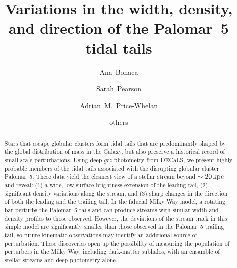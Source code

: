 \documentclass[twocolumn]{aastex62}
\begin{document}
\sloppy\sloppypar\raggedbottom\frenchspacing %

\title{Variations in the width, density, and direction of the Palomar~5 tidal tails}

\author[0000-0002-7846-9787]{Ana~Bonaca}

\author[0000-0003-0256-5446]{Sarah~Pearson}

\author[0000-0003-0872-7098]{Adrian~M.~Price-Whelan}

\author{others}

\begin{abstract}\noindent %
Stars that escape globular clusters form tidal tails that are predominantly shaped by the global distribution of mass in the Galaxy, but also preserve a historical record of small-scale perturbations.
Using deep $grz$ photometry from DECaLS, we present highly probable members of the tidal tails associated with the disrupting globular cluster Palomar~5.
These data yield the cleanest view of a stellar stream beyond $\sim20\,\rm kpc$ and reveal: (1) a wide, low surface-brightness extension of the leading tail, (2) significant density variations along the stream, and (3) sharp changes in the direction of both the leading and the trailing tail.
In the fiducial Milky Way model, a rotating bar perturbs the Palomar~5 tails and can produce streams with similar width and density profiles to those observed.
However, the deviations of the stream track in this simple model are significantly smaller than those observed in the Palomar~5 trailing tail, so future kinematic observations may identify an additional source of perturbation.
These discoveries open up the possibility of measuring the population of perturbers in the Milky Way, including dark-matter subhalos, with an ensamble of stellar streams and deep photometry alone.
\end{abstract}
\end{document}
